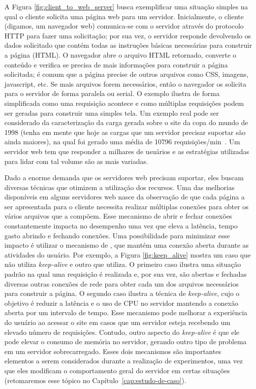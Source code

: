 A Figura \ref{fig:client_to_web_server} busca exemplificar uma situação simples
na qual o cliente solicita uma página web para um servidor. Inicialmente, o
cliente (digamos, um navegador web) comunica-se com o servidor através do
protocolo HTTP para fazer uma solicitação; por sua vez, o servidor responde
devolvendo os dados solicitado que contém todas as instruções básicas
necessárias para construir a página (HTML). O navegador abre o arquivo HTML
retornado, converte o conteúdo e verifica se precisa de mais informações para
construir a página solicitada; é comum que a página precise de outros arquivos
como CSS, imagens, javascript, etc. Se mais arquivos forem necessários, então o
navegador os solicita para o servidor de forma paralela ou serial. O exemplo
ilustra de forma simplificada como uma requisição acontece e como múltiplas
requisições podem ser geradas para construir uma simples tela. Um exemplo real
pode ser considerado da caracterização da carga gerada sobre o site da copa do
mundo de 1998 (tenha em mente que hoje as cargas que um servidor precisar
suportar são ainda maiores), na qual foi gerado uma média de 10796
requisições/min~\citep{worldcup}.  Um servidor web tem que responder a milhares
de usuários e as estratégias utilizadas para lidar com tal volume são as mais
variadas.

Dado a enorme demanda que os servidores web precisam suportar, eles buscam
diversas técnicas que otimizem a utilização dos recursos. Uma das melhorias
disponíveis em alguns servidores web nasce da observação de que cada página a
ser apresentada para o cliente necessita realizar múltiplas conexões para obter
os vários arquivos que a compõem. Esse mecanismo de abrir e fechar
conexões constantemente impacta no desempenho uma vez que eleva a latência,
tempo gasto abrindo e fechando conexões. Uma possibilidade para minimizar esse
impacto é utilizar o mecanismo de , que mantém uma
conexão aberta durante as atividades do usuário. Por exemplo, a Figura
\ref{fig:keep_alive} mostra um caso que não utiliza \emph{keep-alive} e outro
que utiliza. O primeiro caso ilustra uma situação padrão na qual uma requisição
é realizada e, por sua vez, são abertas e fechadas diversas outras conexões de
rede para obter cada um dos arquivos necessários para construir a página. O
segundo caso ilustra a técnica de \emph{keep-alive}, cujo o objetivo é reduzir
a latência e o uso de CPU no servidor mantendo a conexão aberta por um
intervalo de tempo.  Esse mecanismo pode melhorar a experiência do usuário ao
acessar o site em casos que um servidor esteja recebendo um elevado número de
requisições. Contudo, outro aspecto do \emph{keep-alive} é que ele pode elevar
o consumo de memória no servidor, gerando outro tipo de problema em um servidor
sobrecarregado. Esses dois mecanismos são importantes elementos a serem
considerados durante a realização de experimentos, uma vez que eles modificam o
comportamento geral do servidor em certas situações (retomaremos esse tópico no
Capítulo~\ref{cap:estudo-de-caso}).

